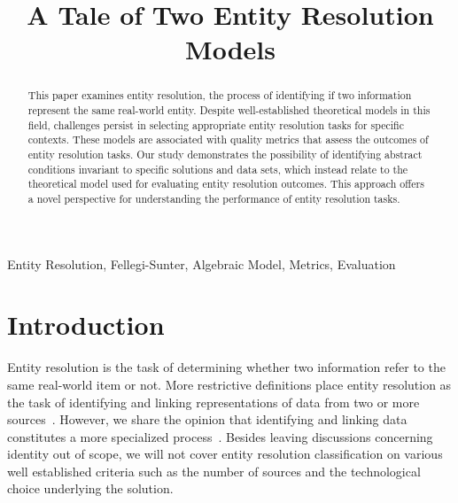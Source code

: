 \documentclass[journal]{IEEEtran}
\begin{document}
    \title{A Tale of Two Entity Resolution Models}
    \author{
    }

    \maketitle

    \theoremstyle{definition}
    \newtheorem{defn}{Definition}[section]
    
    \maketitle
    \begin{abstract}
        This paper examines entity resolution, the process of identifying if two
        information represent the same real-world entity.
        Despite well-established theoretical models in this field, challenges
        persist in selecting appropriate entity resolution tasks for specific
        contexts.
        These models are associated with quality metrics that assess the
        outcomes of entity resolution tasks.
        Our study demonstrates the possibility of identifying abstract
        conditions invariant to specific solutions and data sets, which instead
        relate to the theoretical model used for evaluating entity resolution
        outcomes.
        This approach offers a novel perspective for understanding the
        performance of entity resolution tasks.
    \end{abstract}

    \begin{IEEEkeywords}
        Entity Resolution, Fellegi-Sunter, Algebraic Model, Metrics, Evaluation
    \end{IEEEkeywords}

    \section{Introduction}\label{sec:Introduction}
    Entity resolution is the task of determining whether two information refer
    to the same real-world item or not.
    More restrictive definitions place entity resolution as the task of
    identifying and linking representations of data from two or more
    sources~\cite{Qia17}.
    However, we share the opinion that identifying and linking data constitutes
    a more specialized process~\cite{Tal11}.
    Besides leaving discussions concerning identity out of scope, we will not
    cover entity resolution classification on various well established criteria
    such as the number of sources and the technological choice underlying the
    solution.
    
\end{document}
